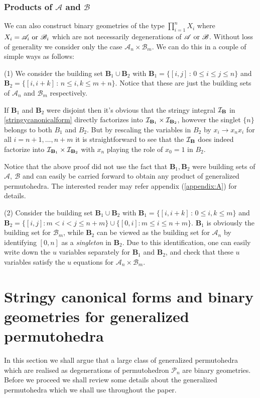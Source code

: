 \documentclass[hidelinks,12pt]{article}
\begin{document}
\subsubsection{Products of ${\mathscr A}$ and $\mathscr{B}$}
We can also construct binary geometries of the type $\prod_{i=1}^n X_i$ where $X_i={\mathscr A_i}~{\rm or}~{\mathscr B_i}$ which are not necessarily degenerations of ${\mathscr A}~{\rm or}~{\mathscr B}$. Without loss of generality we consider only the case ${\mathscr A_n}\times {\mathscr B_m}$. We can do this in a couple of simple ways as follows:

(1) We consider the building set $\mathbf{B}_{1}\cup \mathbf{B}_{2}$ with $\mathbf B_1= \{[i,j]\,:\, 0\leq i\leq j\leq n\}$ and $\mathbf B_2= \{[i,i+k]\,:\, n\leq i, k \leq m+n\}$. Notice that these are just the building sets of ${\mathscr A_n}$ and ${\mathscr B_m}$ respectively.

If $\mathbf{B}_{1}$ and $\mathbf{B}_{2}$ were disjoint then it's obvious that the stringy integral ${\cal I}_{\mathbf B}$ in \eqref{stringycanonicalform} directly factorizes into ${\cal I}_{\mathbf B_1}\times {\cal I}_{\mathbf B_2}$, however the singlet $\{n\}$ belongs to both $B_1$ and $B_2$. But by rescaling the variables in $B_2$ by $x_i \rightarrow x_n x_i$ for all $i=n+1,\dots,n+m $ it is straightforward to see that the ${\cal I}_{\mathbf B}$ does indeed factorize into ${\cal I}_{\mathbf B_1}\times {\cal I}_{\mathbf B_2}$ with $x_n$ playing the role of $x_0=1$ in $B_2$.

Notice that the above proof did not use the fact that ${\mathbf B_1}, {\mathbf B_2}$ were building sets of ${\mathscr A},~{\mathscr B}$ and can easily be carried forward to obtain any product of generalized permutohedra. The interested reader may refer appendix (\ref{appendix:A}) for details.


(2) Consider the building set  $\mathbf{B}_{1}\cup \mathbf{B}_{2}$ with $\mathbf{B}_{1}=\{[i,i{+}k]\,:\,0\leq i, k\leq m\}$ and $\mathbf{B}_{2}=\{[i,j]: m<i<j\leq n+m \}\cup \{[0,i]:  m\leq i\leq n+m\}$. $\mathbf{B}_{1}$ is obviously the building set for $\mathscr{B}_{m}$, while $\mathbf{B}_{2}$ can be viewed as the building set for $\mathscr{A}_{n}$ by identifying $[0,n]$ as a \emph{singleton} in $\mathbf{B}_{2}$. Due to this identification, one can easily write down the $u$ variables separately for $\mathbf{B}_{1}$ and $\mathbf{B}_{2}$, and check that these $u$ variables satisfy the $u$ equations for $\mathscr{A}_{n}\times \mathscr{B}_{m}$.

\section{Stringy canonical forms and binary geometries for generalized permutohedra}
In this section we shall argue that a large class of generalized permutohedra which are realised as degenerations of permutohedron ${\mathscr P_n}$ are binary geometries. Before we proceed we shall review some details about the generalized permutohedra \cite{Postnikov:2005,Postnikov:2006} which we shall use throughout the paper.
\end{document}
